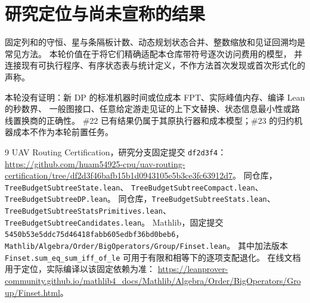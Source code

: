 \documentclass[UTF8,a4paper,11pt]{ctexart}
\theoremstyle{definition}
\begin{document}
\section{研究定位与尚未宣称的结果}
固定列和的守恒、星与条隔板计数、动态规划状态合并、整数缩放和见证回溯均是常见方法。
本轮价值在于将它们精确适配本仓库带符号逐次访问费用的模型，
并连接现有可执行程序、有序状态表与统计定义，不作方法首次发现或首次形式化的声称。

本轮没有证明：新 DP 的标准机器时间或位成本 FPT、实际峰值内存、编译 Lean 的秒数界、
一般图接口、任意给定游走见证的上下文替换、状态信息最小性或路线置换商的正确性。
\#22 已有结果仍属于其原执行器和成本模型；\#23 的归约机器成本不作为本轮前置任务。

\begin{thebibliography}{9}
 UAV Routing Certification，研究分支固定提交 \texttt{df2d3f4}：
\url{https://github.com/huam54925-cpu/uav-routing-certification/tree/df2d3f46bafb15b1d0943105e5b3ce3fc63912d7}。
 同仓库，\texttt{TreeBudgetSubtreeState.lean}、
\texttt{TreeBudgetSubtreeCompact.lean}、\texttt{TreeBudgetSubtreeDP.lean}。
 同仓库，\texttt{TreeBudgetSubtreeStats.lean}、
\texttt{TreeBudgetSubtreeStatsPrimitives.lean}、\texttt{TreeBudgetSubtreeCandidates.lean}。
 Mathlib，固定提交
\texttt{5450b53e5ddc75d46418fabb605edbf36bd0beb6}，
\texttt{Mathlib/Algebra/Order/BigOperators/Group/Finset.lean}。
其中加法版本 \texttt{Finset.sum\_eq\_sum\_iff\_of\_le}
可用于有限和相等下的逐项支配退化。
在线文档用于定位，实际编译以该固定依赖为准：
\url{https://leanprover-community.github.io/mathlib4_docs/Mathlib/Algebra/Order/BigOperators/Group/Finset.html}。
\end{thebibliography}
\end{document}
